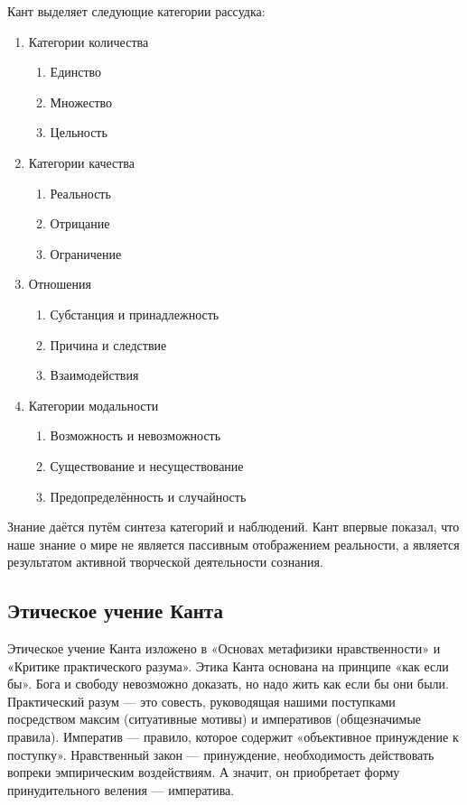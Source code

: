 \documentclass[12pt]{article}
\begin{document}
Кант выделяет следующие категории рассудка:
\begin{enumerate}
\item Категории количества
 \begin{enumerate}
 \item Единство
 \item Множество
 \item Цельность
 \end{enumerate}
 
\item Категории качества
 \begin{enumerate}
 \item Реальность
 \item Отрицание
 \item Ограничение
 \end{enumerate}
\item Отношения
 \begin{enumerate}
 \item Субстанция и принадлежность
 \item Причина и следствие
 \item Взаимодействия
 \end{enumerate}
\item Категории модальности
 \begin{enumerate}
 \item Возможность и невозможность
 \item Существование и несуществование
 \item Предопределённость и случайность
 \end{enumerate}
\end{enumerate}

Знание даётся путём синтеза категорий и наблюдений. Кант впервые показал, что наше знание о мире не
является пассивным отображением реальности, а является результатом активной творческой деятельности
сознания.

\subsection{Этическое учение Канта}
Этическое учение Канта изложено в «Основах метафизики нравственности» и «Критике практического разума».
Этика Канта основана на принципе «как если бы». Бога и свободу невозможно доказать, но надо жить как если бы они были.
Практический разум — это совесть, руководящая нашими поступками посредством максим (ситуативные мотивы) и 
императивов (общезначимые правила).
Императив — правило, которое содержит «объективное принуждение к поступку».
Нравственный закон — принуждение, необходимость действовать вопреки эмпирическим воздействиям.
А значит, он приобретает форму принудительного веления — императива.
\end{document}
